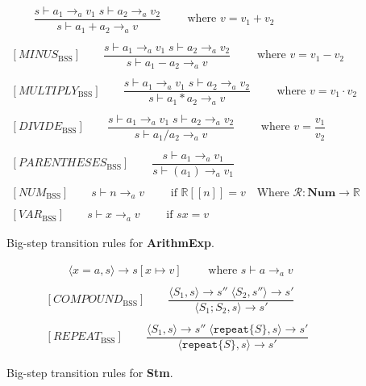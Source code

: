 \begin{figure}[htbp]
	\centering
	\begin{gather*}
		[PLUS_\text{BSS}] 
		\qquad \dfrac
		{s \vdash a_1 \rightarrow_a v_1 \; s \vdash a_2 \rightarrow_a v_2}
		{s \vdash a_1 + a_2 \rightarrow_a v}
		\qquad \text{ where }v = v_1 + v_2
		\\
		\\
		[MINUS_\text{BSS}] 
		\qquad \dfrac
		{s \vdash a_1 \rightarrow_a v_1 \; s \vdash a_2 \rightarrow_a v_2}
		{s \vdash a_1 - a_2 \rightarrow_a v}
		\qquad \text{ where }v = v_1 - v_2
		\\
		\\
		[MULTIPLY_\text{BSS}] 
		\qquad \dfrac
		{s \vdash a_1 \rightarrow_a v_1 \; s \vdash a_2 \rightarrow_a v_2}
		{s \vdash a_1 * a_2 \rightarrow_a v}
		\qquad \text{ where }v = v_1 \cdot v_2
		\\
		\\
		[DIVIDE_\text{BSS}] 
		\qquad \dfrac
		{s \vdash a_1 \rightarrow_a v_1 \; s \vdash a_2 \rightarrow_a v_2}
		{s \vdash a_1 / a_2 \rightarrow_a v}
		\qquad \text{ where }v = \dfrac{v_1}{v_2}
		\\
		\\
		[PARENTHESES_\text{BSS}] 
		\qquad \dfrac
		{s \vdash a_1 \rightarrow_a v_1}
		{s \vdash (a_1) \rightarrow_a v_1}
		\\
		\\
		[NUM_\text{BSS}] 
		\qquad s \vdash n \rightarrow_a v
		\qquad \text{ if } \mathbb{R}[\![n]\!] = v \quad \text{Where } \mathcal{R}:\textbf{Num}\rightarrow \mathbb{R}
		\\
		\\
		[VAR_\text{BSS}] 
		\qquad s \vdash x \rightarrow_a v
		\qquad \text{ if } sx = v
	\end{gather*}
	\caption{Big-step transition rules for \textbf{ArithmExp}.}
	\label{fig:BssArithm}
\end{figure}

\begin{figure}[htbp]
	\centering
	\begin{gather*}
		[ASSIGNMENT_\text{BSS}] 
		\qquad \langle x=a,s\rangle \rightarrow s[x\mapsto v]
		\qquad \text{ where }s\vdash a \rightarrow_a v
		\\
		\\
		[COMPOUND_\text{BSS}] 
		\qquad \dfrac
		{\langle S_1, s\rangle \rightarrow s'' \;\langle S_2, s''\rangle \rightarrow s'}
		{\langle S_1;S_2,s\rangle\rightarrow s'}
		\\
		\\
		[REPEAT_\text{BSS}] 
		\qquad \dfrac
		{\langle S_1, s\rangle \rightarrow s'' \;\langle \texttt{repeat} \{S\}, s\rangle \rightarrow s'}
		{\langle \texttt{repeat} \{S\}, s\rangle\rightarrow s'}
	\end{gather*}
	\caption{Big-step transition rules for \textbf{Stm}.}
	\label{fig:BssStm}
\end{figure}

